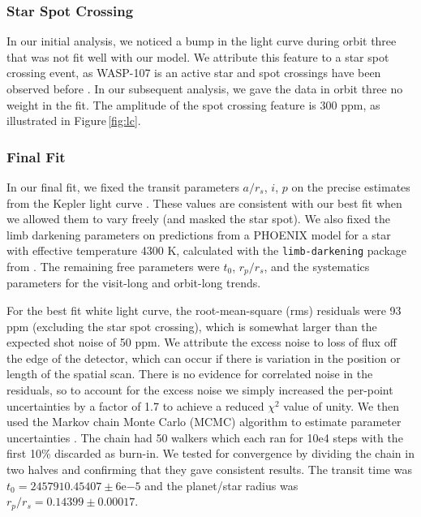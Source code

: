 \documentclass[twocolumn]{aastex61}
\begin{document}
\subsubsection{Star Spot Crossing}
In our initial analysis, we noticed a bump in the light curve during orbit three that was not fit well with our model. We attribute this feature to a star spot crossing event, as WASP-107 is an active star and spot crossings have been observed before \citep{dai17, mocnik17}. In our subsequent analysis, we gave the data in orbit three no weight in the fit. The amplitude of the spot crossing feature is 300 ppm, as illustrated in Figure\,\ref{fig:lc}.

\subsubsection{Final Fit}
In our final fit, we fixed the transit parameters $a/r_s$, $i$, $p$ on the precise estimates from the Kepler light curve \citep{dai17}.  These values are consistent with our best fit when we allowed them to vary freely (and masked the star spot). We also fixed the limb darkening parameters on predictions from a PHOENIX model for a star with effective temperature 4300 K, calculated with the \texttt{limb-darkening} package from \cite{espinoza15}.  The remaining free parameters were $t_0$, $r_p/r_s$, and the systematics parameters for the visit-long and orbit-long trends.

For the best fit white light curve, the root-mean-square (rms) residuals were 93 ppm (excluding the star spot crossing), which is somewhat larger than the expected shot noise of 50 ppm. We attribute the excess noise to loss of flux off the edge of the detector, which can occur if there is variation in the position or length of the spatial scan. There is no evidence for correlated noise in the residuals, so to account for the excess noise we simply increased the per-point uncertainties by a factor of 1.7 to achieve a reduced $\chi^2$ value of unity.  We then used the Markov chain Monte Carlo (MCMC) algorithm to estimate parameter uncertainties \citep{foremanmackey13}.  The chain had 50 walkers which each ran for 10e4 steps with the first 10\% discarded as burn-in. We tested for convergence by dividing the chain in two halves and confirming that they gave consistent results. The transit time was $t_0 = 2457910.45407\pm6\mathrm{e}{-5}$ and the planet/star radius was $r_p/r_s = 0.14399\pm0.00017$. 
\end{document}
